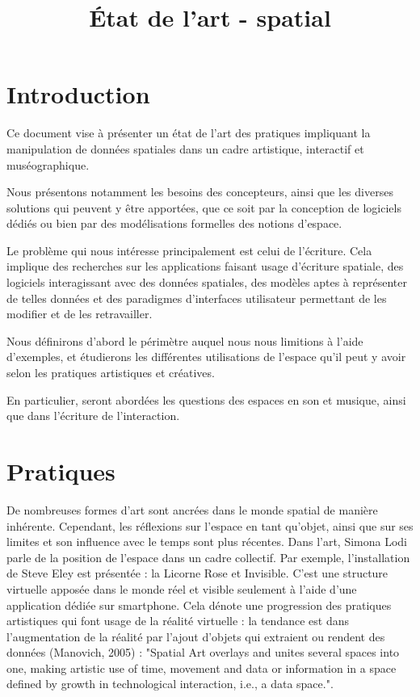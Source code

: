 \documentclass[french,12pt]{article}
\title{État de l'art - spatial}
\date{}
\begin{document}
\maketitle
\newpage
\tableofcontents
\newpage

\section{Introduction}
Ce document vise à présenter un état de l'art des pratiques impliquant la manipulation de 
données spatiales dans un cadre artistique, interactif et muséographique.

Nous présentons notamment les besoins des concepteurs, ainsi que les diverses solutions qui 
peuvent y être apportées, que ce soit par la conception de logiciels dédiés ou bien 
par des modélisations formelles des notions d'espace.

Le problème qui nous intéresse principalement est celui de l'écriture. Cela implique des recherches sur les applications faisant usage d'écriture spatiale, des logiciels interagissant avec des données spatiales, des modèles aptes à représenter de telles données et des paradigmes d'interfaces utilisateur permettant de les modifier et de les retravailler. 
 
Nous définirons d'abord le périmètre auquel nous nous limitions à l'aide d'exemples, et étudierons les différentes utilisations
 de l'espace qu'il peut y avoir selon les pratiques artistiques et créatives.

En particulier, seront abordées les questions des espaces en son et musique, ainsi 
que dans l'écriture de l'interaction.
  


\newpage
\section{Pratiques}
De nombreuses formes d'art sont ancrées dans le monde spatial de manière inhérente. 
Cependant, les réflexions sur l'espace en tant qu'objet, ainsi que sur ses limites et son influence avec le temps sont plus récentes. Dans l'art, Simona Lodi parle de la position de l'espace dans un cadre collectif\cite{lodi_spatial_2014}. Par exemple, l'installation de Steve Eley est présentée : la Licorne Rose et Invisible. C'est une structure virtuelle apposée dans le monde réel et visible seulement à l'aide d'une application dédiée sur smartphone. Cela dénote une progression des pratiques artistiques qui font usage de la réalité virtuelle : la tendance est dans l'augmentation de la réalité par l'ajout d'objets qui extraient ou rendent des données (Manovich, 2005) : "Spatial Art overlays and unites several spaces into one, making artistic use of time, movement and data or information in a space defined by growth in technological interaction, i.e., a data space.".
\end{document}
